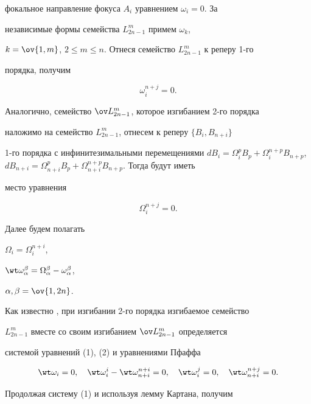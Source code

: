 фокальное направление фокуса $A_i$ уравнением $\omega_i=0$. За 


независимые формы семейства $L^m_{2n-1}$ примем $\omega_k$, 


$k=\ov{1,m}$, $2\le m\le n$. Отнеся семейство $L^m_{2n-1}$ к реперу 1-го 


порядка, получим 


\begin{equation} 


\omega^{n+j}_i=0. 


\end{equation} 


Аналогично, семейство $\ov L^m_{2n-1}$, которое изгибанием 2-го порядка 


наложимо на семейство $L^m_{2n-1}$, отнесем к реперу $\{B_i,B_{n+i}\}$ 


1-го порядка с инфинитезимальными перемещениями $dB_i=\Omega^p_i 


B_p+\Omega^{n+p}_i B_{n+p}$,\; $d 


B_{n+i}=\Omega^p_{n+i}B_p+\Omega^{n+p}_{n+i}B_{n+p}$. Тогда будут иметь 


место уравнения 


\begin{equation} 


\Omega^{n+j}_i=0. 


\end{equation} 


Далее будем полагать 


$\Omega_i=\Omega^{n+i}_i$, 


$\wt\omega^\beta_\alpha=\Omega^\beta_\alpha-\omega^\beta_\alpha$, 


$\alpha,\beta=\ov{1,2n}$. 


 


Как известно \cite{1}, при изгибании 2-го порядка изгибаемое семейство 


$L^m_{2n-1}$ вместе со своим изгибанием $\ov L^m_{2n-1}$ определяется 


системой уравнений (1), (2) и уравнениями Пфаффа 


$$ 


\wt\omega_i=0,\quad \wt\omega^i_i-\wt\omega^{n+i}_{n+i}=0,\quad 


\wt\omega^j_i=0,\quad \wt\omega^{n+j}_{n+i}=0. 


$$ 


 


Продолжая систему (1) и используя лемму Картана, получим 


